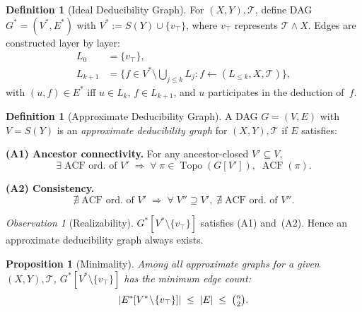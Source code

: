 \documentclass{uai2026} %
\theoremstyle{remark}
\newtheorem{observation}{Observation}
\theoremstyle{plain}
\newtheorem{proposition}[theorem]{Proposition}
\theoremstyle{definition}
\newtheorem{definition}[theorem]{Definition}
\begin{document}
\begin{definition}[Ideal Deducibility Graph]
\label{def:ideal-graph}
For $(X,Y),\mathcal{T}$, define DAG
$G^{*}\!=\!(V^{*}\!,E^{*})$ with
$V^{*}\!:=S(Y)\cup\{v_{\top}\}$, where $v_{\top}$
represents $\mathcal{T}\wedge X$.  Edges are constructed
layer by layer:
\begin{equation}\label{eq:ideal-layers}
\begin{aligned}
  L_{0}&=\{v_{\top}\},\\
  L_{k+1}&=\bigl\{f\!\in\!V^{*}\!\setminus\!
  \textstyle\bigcup_{j\le k}L_{j}:
  f\!\leftarrow\!(L_{\le k},X,\mathcal{T})\bigr\},
\end{aligned}
\end{equation}
with $(u,f)\!\in\!E^{*}$ iff $u\!\in\!L_{k}$,
$f\!\in\!L_{k+1}$, and $u$ participates in the deduction
of~$f$.
\end{definition}

\begin{definition}[Approximate Deducibility Graph]
\label{def:approximate-graph}
A DAG $G\!=\!(V,E)$ with $V\!=\!S(Y)$ is an
\emph{approximate deducibility graph} for
$(X,Y),\mathcal{T}$ if $E$ satisfies:

\noindent
\textbf{(A1) Ancestor connectivity.}
For any ancestor-closed $V'\!\subseteq\!V$,
\begin{equation}\label{eq:a1}
  \exists\;\text{ACF ord.\ of }V'
  \;\Longrightarrow\;
  \forall\;\pi\in\operatorname{Topo}(G[V']),\;
  \operatorname{ACF}(\pi).
\end{equation}

\noindent
\textbf{(A2) Consistency.}
\begin{equation}\label{eq:a2}
  \nexists\;\text{ACF ord.\ of }V'
  \;\Longrightarrow\;
  \forall\;V''\!\supseteq\!V',\;
  \nexists\;\text{ACF ord.\ of }V''.
\end{equation}
\end{definition}

\begin{observation}[Realizability]
\label{obs:realizability}
$G^{*}[V^{*}\!\setminus\!\{v_{\top}\}]$ satisfies
(A1) and~(A2).  Hence an approximate deducibility graph
always exists.
\end{observation}

\begin{proposition}[Minimality]
\label{prop:minimality}
Among all approximate graphs for a given
$(X,Y),\mathcal{T}$,
$G^{*}[V^{*}\!\setminus\!\{v_{\top}\}]$ has the
minimum edge count:
\begin{equation}\label{eq:edge-bound}
  |E^{*}[V^{*}\!\setminus\!\{v_{\top}\}]|
  \;\le\;|E|
  \;\le\;\tbinom{n}{2}.
\end{equation}
\end{proposition}
\end{document}
